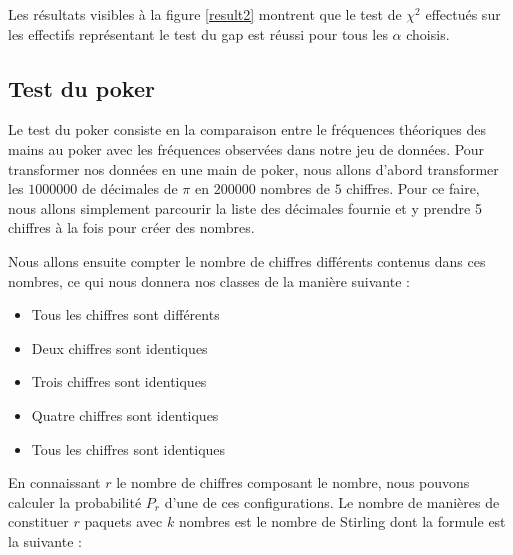 \documentclass[10pt,a4paper]{article}
\begin{document}
Les résultats visibles à la figure \ref{result2} montrent que le test de $\chi^2$ effectués sur les effectifs représentant le test du gap est réussi pour tous les $\alpha$ choisis.

\subsection{Test du poker}

Le test du poker consiste en la comparaison entre le fréquences théoriques des mains au poker avec les
fréquences observées dans notre jeu de données. Pour transformer nos données en une main de poker, nous allons d'abord transformer les $1 000 000$ de décimales de $\pi$ en $200 000$ nombres de $5$ chiffres. Pour ce faire, nous allons simplement parcourir la liste des décimales fournie et y prendre 5 chiffres à la fois pour créer des nombres.\newline \newline

Nous allons ensuite compter le nombre de chiffres différents contenus dans ces nombres, ce qui nous donnera nos classes de la manière
suivante : \\
\begin{itemize}
\item Tous les chiffres sont différents
\item Deux chiffres sont identiques
\item Trois chiffres sont identiques
\item Quatre chiffres sont identiques
\item Tous les chiffres sont identiques
\end{itemize}
\bigskip
En connaissant $r$ le nombre de chiffres composant le nombre, nous pouvons calculer la probabilité $P_r$ d'une de ces configurations.
Le nombre de manières de constituer $r$ paquets avec $k$ nombres est le nombre de Stirling dont la formule est la suivante :
\end{document}
